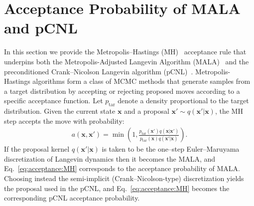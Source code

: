 \section{Acceptance Probability of MALA and pCNL}
\label{sec:appx:acceptence prob mala and pcnl}
In this section we provide the Metropolis–Hastings (MH)~\cite{metropolis1953equation, metropolis_hastings} acceptance rule that underpins both the Metropolis-Adjusted Langevin Algorithm (MALA)~\cite{bj/1178291835, roberts2002langevin} and the preconditioned Crank–Nicolson Langevin algorithm (pCNL)~\cite{Cotter_2013pcnl, Beskos_2017geometricMCMC}.
Metropolis-Hastings algorithms form a class of MCMC methods that generate samples from a target distribution by accepting or rejecting proposed moves according to a specific acceptance function.
Let $p_{\text{tar}}$ denote a density proportional to the target distribution. Given the current state $\mathbf{x}$ and a proposal $\mathbf{x}'\sim q(\mathbf{x}'|\mathbf{x})$, the MH step accepts the move with probability:
\begin{align}
    \label{eq:acceptance:MH}
    a(\mathbf{x},\mathbf{x}')= \min\left(1, \frac{p_{\text{tar}}(\mathbf{x}')q(\mathbf{x}|\mathbf{x}')}{p_{\text{tar}}(\mathbf{x})q(\mathbf{x}'|\mathbf{x})} \right).
\end{align}
If the proposal kernel $q(\mathbf{x}'|\mathbf{x})$ is taken to be the one–step Euler–Maruyama discretization of Langevin dynamics then it becomes the MALA, and Eq.~\ref{eq:acceptance:MH} corresponds to the acceptance probability of MALA.
Choosing instead the semi-implicit (Crank–Nicolson-type) discretization yields the proposal used in the pCNL, and Eq.~\ref{eq:acceptance:MH} becomes the corresponding pCNL acceptance probability.\\

